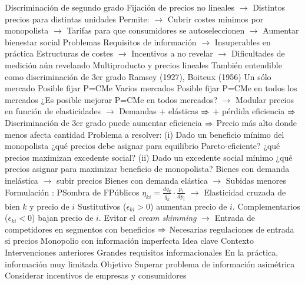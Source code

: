 \documentclass{nuevotema}
\begin{document}
\begin{esquemal}
				\4 Discriminación de segundo grado
				\4[] Fijación de precios no lineales
				\4[] $\to$ Distintos precios para distintas unidades
				\4[] Permite:
				\4[] $\to$ Cubrir costes mínimos por monopolista
				\4[] $\to$ Tarifas para que consumidores se autoseleccionen
				\4[] $\to$ Aumentar bienestar social
				\4 Problemas
				\4[] Requisitos de información 
				\4[] $\to$ Insuperables en práctica
				\4[] Estructuras de costes
				\4[] $\to$ Incentivos a no revelar
				\4[] $\to$ Dificultades de medición aún revelando
			\3 Multiproducto y precios lineales
				\4 También entendible como discriminación de 3er grado
				\4 Ramsey (1927), Boiteux (1956)
				\4 Un sólo mercado
				\4[] Posible fijar P=CMe
				\4 Varios mercados
				\4[] Posible fijar P=CMe en todos los mercados
				\4 ¿Es posible mejorar P=CMe en todos mercados?
				\4[] $\to$ Modular precios en función de elasticidades
				\4[] $\to$ Demandas + elásticas $\then$ + pérdida eficiencia
				\4[] $\then$ Discriminación de 3er grado puede aumentar eficiencia
				\4[] $\then$ Precio más alto donde menos afecta cantidad
				\4 Problema a resolver:
				\4[] (i) Dado un beneficio mínimo del monopolista
				\4[] ¿qué precios debe asignar para equilibrio Pareto-eficiente?
				\4[] ¿qué precios maximizan excedente social?
				\4[] (ii) Dado un excedente social mínimo
				\4[] ¿qué precios asignar para maximizar beneficio de monopolista?
				\4 Bienes con demanda inelástica
				\4[] $\to$ subir precios
				\4 Bienes con demanda elástica
				\4[] $\to$ Subidas menores
				\4 Formulación
				\4[] 
				\4[] : PSombra de FPúblicos
				\4[] $\eta_{ki} = \frac{d q_k}{q_k} \cdot \frac{p_i}{d p_i}$
				\4[] $\to$ Elasticidad cruzada de bien $k$ y precio de $i$
				\4[$\then$] Sustitutivos ($\epsilon_{ki} > 0$) aumentan precio de $i$.
				\4[$\then$] Complementarios ($\epsilon_{ki} <0$) bajan precio de $i$.
				\4[] Evitar el \textit{cream skimming}
				\4[] $\to$ Entrada de competidores en segmentos con beneficios
				\4[] $\then$ Necesarias regulaciones de entrada si precios
		\2 Monopolio con información imperfecta
			\3 Idea clave
				\4 Contexto
				\4[] Intervenciones anteriores
				\4[] Grandes requisitos informacionales
				\4[] En la práctica, información muy limitada
				\4 Objetivo
				\4[] Superar problema de información asimétrica
				\4[] Considerar incentivos de empresas y consumidores

\end{esquemal}
\end{document}
